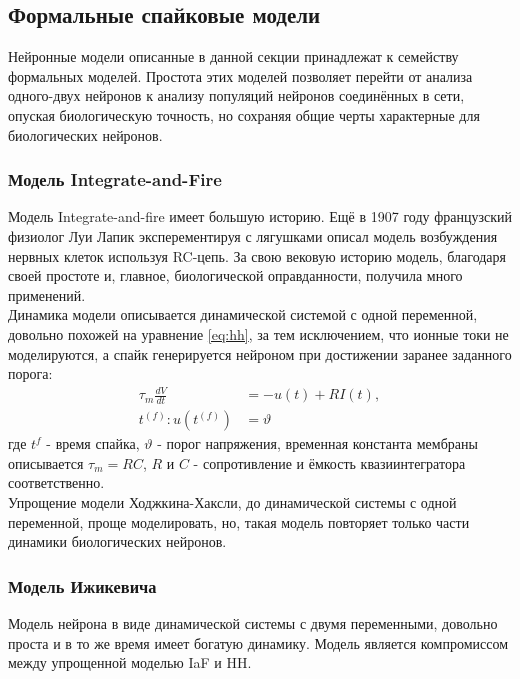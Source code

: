 \documentclass[a4paper,10pt]{article}
\begin{document}
\subsection{Формальные спайковые модели}   
\indent Нейронные модели описанные в данной секции принадлежат к семейству формальных моделей. Простота этих моделей позволяет перейти от анализа одного-двух нейронов к анализу популяций нейронов соединённых в сети, опуская биологическую точность, но сохраняя общие черты характерные для биологических нейронов.\\
\subsubsection{Модель Integrate-and-Fire}

\indent Модель Integrate-and-fire имеет большую историю. Ещё в 1907 году 	французский физиолог Луи Лапик эксперементируя с лягушками описал модель возбуждения нервных клеток используя RC-цепь\cite{Lapicque}. За свою вековую историю модель, благодаря своей простоте и, главное, биологической оправданности, получила много применений.\\
   \indent Динамика модели описывается динамической системой с одной переменной, довольно похожей на уравнение \ref{eq:hh}, за тем исключением, что ионные токи не моделируются, а спайк генерируется нейроном при достижении заранее заданного порога:\\
   \begin{equation}\label{eq:iaf}
   \begin{split}
   \tau_{m}\frac{dV}{dt}&=-u(t)+R I(t),\\
   t^{(f)}: u(t^{(f)}) &= \vartheta 
   \end{split}
   \end{equation}
где $t^{f}$ - время спайка, $\vartheta$ - порог напряжения, временная константа мембраны описывается $\tau_{m}=RC$, $R$ и $C$ - сопротивление и ёмкость квазиинтегратора соответственно.\\   
\indent Упрощение модели Ходжкина-Хаксли, до динамической системы с одной переменной, проще моделировать, но, такая модель повторяет только части динамики биологических нейронов.

\subsubsection{Модель Ижикевича}
Модель нейрона в виде динамической системы с двумя переменными, довольно проста и в то же время имеет богатую динамику. Модель является компромиссом между упрощенной моделью IaF и HH. 
\end{document}
